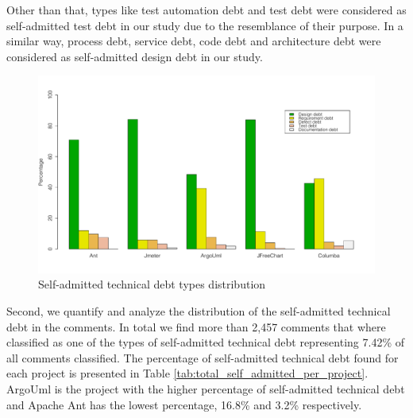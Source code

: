 Other than that, types like test automation debt and test debt were considered as self-admitted test debt in our study due to the resemblance of their purpose. In a similar way, process debt, service debt, code debt and architecture debt were considered as self-admitted design debt in our study.


\begin{figure}[thb!]
  \centering
  \label{fig:satd_distribution}
  \includegraphics[width=1\textwidth]{figures/technical_debt_distribution.pdf}
  \caption{Self-admitted technical debt types distribution}
\end{figure}

Second, we quantify and analyze the distribution of the self-admitted technical debt in the comments. In total we find more than 2,457 comments that where classified as one of the types of self-admitted technical debt representing 7.42\% of all comments classified. The percentage of self-admitted technical debt found for each project is presented in Table \ref{tab:total_self_admitted_per_project}. ArgoUml is the project with the higher percentage of self-admitted technical debt and Apache Ant has the lowest percentage, 16.8\% and 3.2\% respectively.

